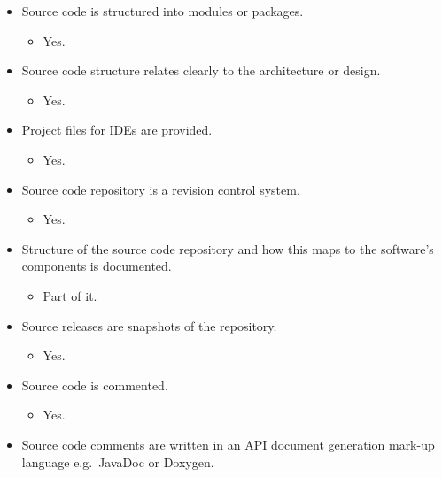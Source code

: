 \begin{itemize}
\itemsep1pt\parskip0pt
\item
  Source code is structured into modules or packages.

  \begin{itemize}
  \itemsep1pt\parskip0pt
  \item
    Yes.
  \end{itemize}
\item
  Source code structure relates clearly to the architecture or design.

  \begin{itemize}
  \itemsep1pt\parskip0pt
  \item
    Yes.
  \end{itemize}
\item
  Project files for IDEs are provided.

  \begin{itemize}
  \itemsep1pt\parskip0pt
  \item
    Yes.
  \end{itemize}
\item
  Source code repository is a revision control system.

  \begin{itemize}
  \itemsep1pt\parskip0pt
  \item
    Yes.
  \end{itemize}
\item
  Structure of the source code repository and how this maps to the
  software's components is documented.

  \begin{itemize}
  \itemsep1pt\parskip0pt
  \item
    Part of it.
  \end{itemize}
\item
  Source releases are snapshots of the repository.

  \begin{itemize}
  \itemsep1pt\parskip0pt
  \item
    Yes.
  \end{itemize}
\item
  Source code is commented.

  \begin{itemize}
  \itemsep1pt\parskip0pt
  \item
    Yes.
  \end{itemize}
\item
  Source code comments are written in an API document generation mark-up
  language e.g.~JavaDoc or Doxygen.


\end{itemize}
